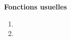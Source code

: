 \begin{exercice}
\hfill{\bf Fonctions usuelles}
\begin{enumerate}
\item {}
\item {}
\end{enumerate}
 
\end{exercice}

